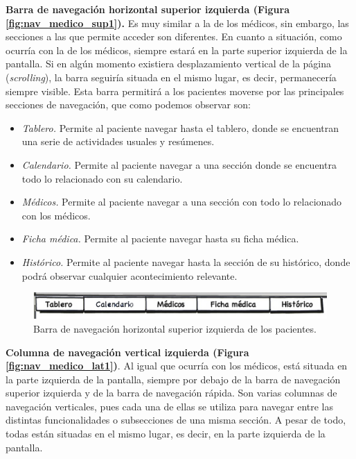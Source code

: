 \documentclass[a4paper,oneside,11pt]{book}
\begin{document}
		\bigskip
		\bigskip
		\textbf{Barra de navegación horizontal superior izquierda (Figura \ref{fig:nav_medico_sup1}).} Es muy similar a la de los médicos, sin embargo, las secciones a las que permite acceder son diferentes. En cuanto a situación, como ocurría con la de los médicos, siempre estará en la parte superior izquierda de la pantalla. Si en algún momento existiera desplazamiento vertical de la página (\textit{scrolling}), la barra seguiría situada en el mismo lugar, es decir, permanecería siempre visible. Esta barra permitirá a los pacientes moverse por las principales secciones de navegación, que como podemos observar son:
		\begin{itemize}
			\item \textit{Tablero.} Permite al paciente navegar hasta el tablero, donde se encuentran una serie de actividades usuales y resúmenes.
			\item \textit{Calendario.} Permite al paciente navegar a una sección donde se encuentra todo lo relacionado con su calendario.
			\item \textit{Médicos.} Permite al paciente navegar a una sección con todo lo relacionado con los médicos.
			\item \textit{Ficha médica.} Permite al paciente navegar hasta su ficha médica.
			\item \textit{Histórico.} Permite al paciente navegar hasta la sección de su histórico, donde podrá observar cualquier acontecimiento relevante.
		\end{itemize}
		
		
		\begin{figure}[H]
		  \centering
		    \includegraphics[width=15cm]{img/jpg/nav/paciente_sup1.jpg}
		  \caption{Barra de navegación horizontal superior izquierda de los pacientes.}
		  \label{fig:nav_paciente_sup1}
		\end{figure}
		
		\textbf{Columna de navegación vertical izquierda (Figura \ref{fig:nav_medico_lat1})}. Al igual que ocurría con los médicos, está situada en la parte izquierda de la pantalla, siempre por debajo de la barra de navegación superior izquierda y de la barra de navegación rápida. Son varias columnas de navegación verticales, pues cada una de ellas se utiliza para navegar entre las distintas funcionalidades o subsecciones de una misma sección. A pesar de todo, todas están situadas en el mismo lugar, es decir, en la parte izquierda de la pantalla.
		
\end{document}
